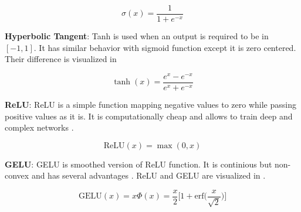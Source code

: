 \begin{equation}
\label{eqn:sigmoid_fcn}
\sigma(x) = \frac{1}{1+e^{-x}}
\end{equation}

\textbf{Hyperbolic Tangent}: Tanh is used when an output is required to be in $[-1,1]$. It has similar behavior with sigmoid function except it is zero centered. Their difference is visualized in 

\begin{equation}
\label{eqn:tanh_fcn}
\tanh(x) = \frac{e^x - e^{-x}}{e^x + e^{-x}}
\end{equation}

\textbf{ReLU}: ReLU is a simple function mapping negative values to zero while passing positive values as it is. It is computationally cheap and allows to train deep and complex networks \cite{glorot_deep_2011}.

\begin{equation}
\label{eqn:relu_fcn}
\textrm{ReLU}(x) = \max(0, x)
\end{equation}

\textbf{GELU}: GELU is smoothed version of ReLU function. It is continious but non-convex and has several advantages \cite{hendrycks_gaussian_2020}. ReLU and GELU are visualized in  .

\begin{equation}
\label{eqn:gelu_fcn}
\textrm{GELU}(x) = x \Phi(x) = \frac{x}{2} \bigg[ 1 + \textrm{erf} \Big( \frac{x}{\sqrt{2}} \Big) \bigg]
\end{equation}

